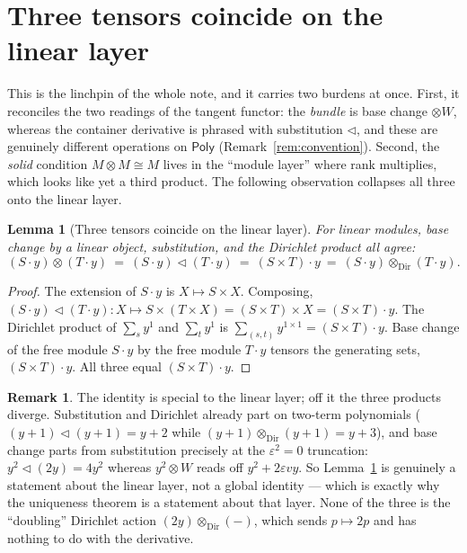 \documentclass[11pt]{article}
\newtheorem{lemma}[theorem]{Lemma}
\theoremstyle{definition}
\newtheorem{remark}[theorem]{Remark}
\newcommand{\Poly}{\mathsf{Poly}}
\begin{document}
\section{Three tensors coincide on the linear layer}\label{sec:coincide}

This is the linchpin of the whole note, and it carries two burdens at once. First, it reconciles the
two readings of the tangent functor: the \emph{bundle} is base change $\otimes W$, whereas the
container derivative is phrased with substitution $\lhd$, and these are genuinely different operations
on $\Poly$ (Remark~\ref{rem:convention}). Second, the \emph{solid} condition $M\otimes M\cong M$
lives in the ``module layer'' where rank multiplies, which looks like yet a third product. The
following observation collapses all three onto the linear layer.

\begin{lemma}[Three tensors coincide on the linear layer]\label{lem:coincide}
For linear modules, base change by a linear object, substitution, and the Dirichlet product all
agree:
\[
  (S\cdot y)\otimes(T\cdot y)\ =\ (S\cdot y)\lhd(T\cdot y)\ =\ (S\times T)\cdot y\ =\
  (S\cdot y)\otimes_{\mathrm{Dir}}(T\cdot y).
\]
\end{lemma}

\begin{proof}
The extension of $S\cdot y$ is $X\mapsto S\times X$. Composing,
$(S\cdot y)\lhd(T\cdot y)\colon X\mapsto S\times(T\times X)=(S\times T)\times X=(S\times T)\cdot y$.
The Dirichlet product of $\sum_{s}y^1$ and $\sum_t y^1$ is $\sum_{(s,t)}y^{1\times1}=(S\times
T)\cdot y$. Base change of the free module $S\cdot y$ by the free module $T\cdot y$ tensors the
generating sets, $(S\times T)\cdot y$. All three equal $(S\times T)\cdot y$.
\end{proof}

\begin{remark}
The identity is special to the linear layer; off it the three products diverge. Substitution and
Dirichlet already part on two-term polynomials ($(y+1)\lhd(y+1)=y+2$ while
$(y+1)\otimes_{\mathrm{Dir}}(y+1)=y+3$), and base change parts from substitution precisely at the
$\varepsilon^2=0$ truncation: $y^2\lhd(2y)=4y^2$ whereas $y^2\otimes W$ reads off
$y^2+2\varepsilon vy$. So Lemma~\ref{lem:coincide} is genuinely a statement about the linear layer,
not a global identity --- which is exactly why the uniqueness theorem is a statement about that layer.
None of the three is the ``doubling'' Dirichlet action $(2y)\otimes_{\mathrm{Dir}}(-)$, which sends
$p\mapsto2p$ and has nothing to do with the derivative.
\end{remark}
\end{document}
